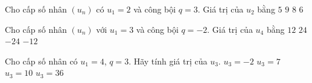 \begin{ex}%
	Cho cấp số nhân $(u_n)$ có $u_1=2$ và công bội $q=3$. Giá trị của $u_2$ bằng
	\choice
	{$5$}
	{$9$}
	{$8$}
	{\True $6$}
\end{ex}

%

\begin{ex}%
	Cho cấp số nhân $\left(u_n\right)$ với $u_1=3$ và công bội $q=-2$. Giá trị của $u_4$ bằng
	\choice
	{$12$}
	{$24$}
	{\True $-24$}
	{$-12$}
\end{ex}

\begin{ex}%
	Cho cấp số nhân có $u_1=4$, $q=3$. Hãy tính giá trị của $u_3$.
	\choice
	{$u_3=-2$}
	{$u_3=7$}
	{$u_3=10$}
	{\True $u_3=36$}
\end{ex}

